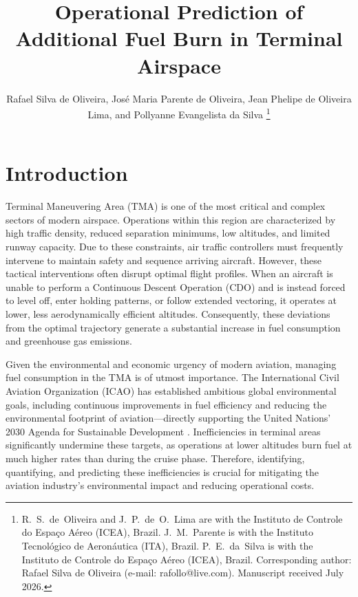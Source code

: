 \documentclass[lettersize,journal]{IEEEtran}
\begin{document}
\title{Operational Prediction of Additional Fuel Burn in Terminal Airspace}

\author{Rafael Silva de Oliveira, José Maria Parente de Oliveira, Jean Phelipe de Oliveira Lima, and Pollyanne Evangelista da Silva%
\thanks{R.~S.~de~Oliveira and J.~P.~de~O.~Lima are with the Instituto de Controle do Espa\c{c}o A\'ereo (ICEA), Brazil. J.~M.~Parente is with the Instituto Tecnol\'ogico de Aeron\'autica (ITA), Brazil. P.~E.~da~Silva is with the Instituto de Controle do Espa\c{c}o A\'ereo (ICEA), Brazil. Corresponding author: Rafael Silva de Oliveira (e-mail: rafollo@live.com). Manuscript received July 2026.}}


\maketitle




\section{Introduction}
\label{sec:intro}

 Terminal Maneuvering Area (TMA) is one of the most critical and complex sectors of modern airspace. Operations within this region are characterized by high traffic density, reduced separation minimums, low altitudes, and limited runway capacity. Due to these constraints, air traffic controllers must frequently intervene to maintain safety and sequence arriving aircraft. However, these tactical interventions often disrupt optimal flight profiles. When an aircraft is unable to perform a Continuous Descent Operation (CDO) and is instead forced to level off, enter holding patterns, or follow extended vectoring, it operates at lower, less aerodynamically efficient altitudes. Consequently, these deviations from the optimal trajectory generate a substantial increase in fuel consumption and greenhouse gas emissions.

Given the environmental and economic urgency of modern aviation, managing fuel consumption in the TMA is of utmost importance. The International Civil Aviation Organization (ICAO) has established ambitious global environmental goals, including continuous improvements in fuel efficiency and reducing the environmental footprint of aviation—directly supporting the United Nations' 2030 Agenda for Sustainable Development \cite{doc9750}. Inefficiencies in terminal areas significantly undermine these targets, as operations at lower altitudes burn fuel at much higher rates than during the cruise phase. Therefore, identifying, quantifying, and predicting these inefficiencies is crucial for mitigating the aviation industry's environmental impact and reducing operational costs.
\end{document}
